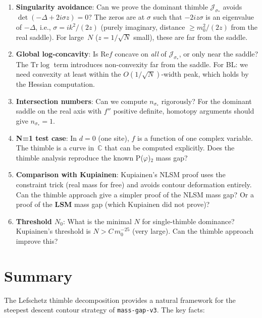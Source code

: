 \documentclass[12pt]{article}
\theoremstyle{definition}
\theoremstyle{remark}
\newcommand{\C}{\mathbb{C}}
\newcommand{\Tr}{\mathrm{Tr}}
\newcommand{\ph}{\varphi}
\newcommand{\re}{\mathrm{Re}}
\begin{document}
\begin{enumerate}
\item \textbf{Singularity avoidance}: Can we prove the dominant
  thimble $\mathcal{J}_{\sigma_*}$ avoids $\det(-\Delta+2i\sigma z)=0$?
  The zeros are at $\sigma$ such that $-2iz\sigma$ is an eigenvalue
  of $-\Delta$, i.e., $\sigma = ik^2/(2z)$ (purely imaginary,
  distance $\ge m_0^2/(2z)$ from the real saddle). For large~$N$
  ($z = 1/\sqrt{N}$ small), these are far from the saddle.

\item \textbf{Global log-concavity}: Is $\re f$ concave on
  \emph{all} of $\mathcal{J}_{\sigma_*}$, or only near the saddle?
  The $\Tr\log$ term introduces non-convexity far from the saddle.
  For BL: we need convexity at least within the
  $O(1/\sqrt{N})$-width peak, which holds by the Hessian computation.

\item \textbf{Intersection numbers}: Can we compute $n_{\sigma_*}$
  rigorously? For the dominant saddle on the real axis with $f''$
  positive definite, homotopy arguments should give $n_{\sigma_*}=1$.

\item \textbf{N=1 test case}: In $d = 0$ (one site), $f$ is a
  function of one complex variable. The thimble is a curve in~$\C$
  that can be computed explicitly. Does the thimble analysis
  reproduce the known P($\ph$)$_2$ mass gap?

\item \textbf{Comparison with Kupiainen}: Kupiainen's NLSM proof
  uses the constraint trick (real mass for free) and avoids contour
  deformation entirely. Can the thimble approach give a simpler
  proof of the NLSM mass gap? Or a proof of the \textbf{LSM} mass
  gap (which Kupiainen did not prove)?

\item \textbf{Threshold $N_0$}: What is the minimal $N$ for
  single-thimble dominance? Kupiainen's threshold is
  $N > C\,m_0^{-25}$ (very large). Can the thimble approach
  improve this?
\end{enumerate}

\section{Summary}

The Lefschetz thimble decomposition provides a natural framework
for the steepest descent contour strategy of \texttt{mass-gap-v3}.
The key facts:
\end{document}
